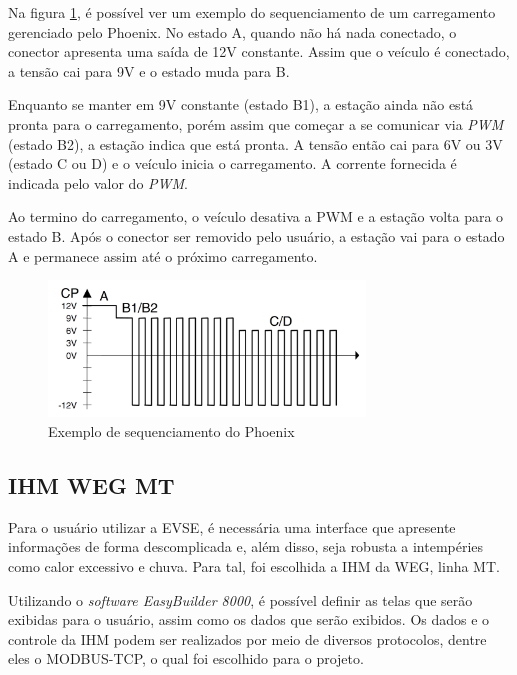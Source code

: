       Na figura \ref{fig:phoenix}, é possível ver um exemplo do sequenciamento de um carregamento gerenciado pelo Phoenix. No estado A, quando não há nada conectado, o conector apresenta uma saída de 12V constante. Assim que o veículo é conectado, a tensão cai para 9V e o estado muda para B. 

      Enquanto se manter em 9V constante (estado B1), a estação ainda não está pronta para o carregamento, porém assim que começar a se comunicar via \textit{\ac{PWM}} (estado B2), a estação indica que está pronta. A tensão então cai para 6V ou 3V (estado C ou D) e o veículo inicia o carregamento. A corrente fornecida é indicada pelo valor do \textit{\ac{PWM}}. 

      Ao termino do carregamento, o veículo desativa a PWM e a estação volta para o estado B. Após o conector ser removido pelo usuário, a estação vai para o estado A e permanece assim até o próximo carregamento.

      \begin{figure}[H]
        \begin{center}
          \includegraphics[width=0.75\textwidth,natwidth=400,natheight=288]{assets/images/phoenix.jpg}
          \caption{Exemplo de sequenciamento do Phoenix}
          \label{fig:phoenix}
        \end{center}
      \end{figure}

    \subsection{IHM WEG MT}
    \label{methodology:devices:ihm}

      Para o usuário utilizar a \ac{EVSE}, é necessária uma interface que apresente informações de forma descomplicada e, além disso, seja robusta a intempéries como calor excessivo e chuva. Para tal, foi escolhida a \ac{IHM} da WEG, linha MT.

      Utilizando o \textit{software EasyBuilder 8000}, é possível definir as telas que serão exibidas para o usuário, assim como os dados que serão exibidos. Os dados e o controle da IHM podem ser realizados por meio de diversos protocolos, dentre eles o MODBUS-TCP, o qual foi escolhido para o projeto.

